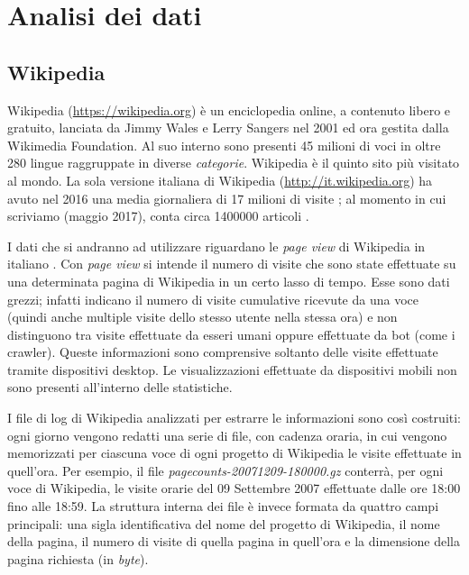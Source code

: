 \chapter{Analisi dei dati}
\bigskip

\section{Wikipedia}
\bigskip
Wikipedia (\url{https://wikipedia.org}) è un enciclopedia online, a contenuto libero e gratuito, lanciata da Jimmy 
Wales e Lerry Sangers nel 2001 ed ora gestita dalla Wikimedia Foundation. Al suo interno sono presenti 45 milioni di voci in 
oltre 280 lingue raggruppate in diverse \textit{categorie}. Wikipedia è il quinto sito più visitato al mondo. La sola 
versione italiana di Wikipedia (\url{http://it.wikipedia.org}) ha avuto nel 2016  una media giornaliera di 17 milioni di 
visite \cite{it_wikipedia_views_2016}; al momento in cui scriviamo (maggio 2017), conta circa 1400000 articoli 
\cite{wikipedia_stats}.
\bigskip

I dati che si andranno ad utilizzare riguardano le \textit{page view} di Wikipedia in italiano \cite{wikipedia_pageviews}. 
Con \textit{page view} si intende il numero di visite che sono state effettuate su una determinata pagina di Wikipedia in un 
certo lasso di tempo. Esse sono dati grezzi; infatti indicano il numero di visite cumulative ricevute da una voce (quindi 
anche multiple visite dello stesso utente nella stessa ora) e non distinguono tra visite effettuate da esseri umani oppure 
effettuate da bot (come i crawler). Queste informazioni sono comprensive soltanto delle visite effettuate tramite dispositivi 
desktop. Le visualizzazioni effettuate da dispositivi mobili non sono presenti all'interno delle statistiche.
\bigskip

I file di log di Wikipedia analizzati per estrarre le informazioni sono così costruiti: ogni giorno 
vengono redatti una serie di file, con cadenza oraria, in cui vengono memorizzati per ciascuna voce di ogni progetto di 
Wikipedia le visite effettuate in quell'ora. Per esempio, il file \textit{pagecounts-20071209-180000.gz} conterrà, per ogni 
voce di Wikipedia, le visite orarie del 09 Settembre 2007 effettuate dalle ore 18:00 fino alle 18:59. La struttura interna 
dei file è invece formata da quattro campi principali: una sigla identificativa del nome del progetto di Wikipedia, il nome 
della pagina, il numero di visite di quella pagina in quell'ora e la dimensione della pagina richiesta (in \textit{byte}).
\bigskip 
  
